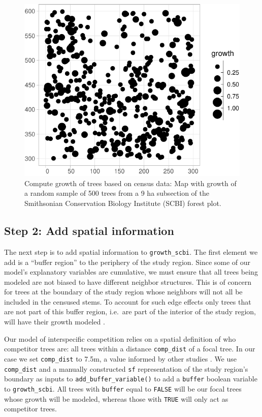 \documentclass[12pt]{article}
\begin{document}
\begin{figure}

{\centering \includegraphics[width=0.66\linewidth]{Figures/scbi-trees-1} 

}

\caption{Compute growth of trees based on census data: Map with growth of a random sample of 500 trees from a 9 ha subsection of the Smithsonian Conservation Biology Institute (SCBI) forest plot.}\label{fig:scbi-trees}
\end{figure}

\hypertarget{spatial-information}{%
\subsection{Step 2: Add spatial information}\label{spatial-information}}

The next step is to add spatial information to \texttt{growth\_scbi}.
The first element we add is a ``buffer region'' to the periphery of the
study region. Since some of our model's explanatory variables are
cumulative, we must ensure that all trees being modeled are not biased
to have different neighbor structures. This is of concern for trees at
the boundary of the study region whose neighbors will not all be
included in the censused stems. To account for such edge effects only
trees that are not part of this buffer region, i.e.~are part of the
interior of the study region, will have their growth modeled
\citep{waller_applied_2004}.

Our model of interspecific competition relies on a spatial definition of
who competitor trees are: all trees within a distance
\texttt{comp\_dist} of a focal tree. In our case we set
\texttt{comp\_dist} to 7.5m, a value informed by other studies
\citep[\citet{uriarte_spatially_2004},
\citet{canham_neighborhood_2006}]{canham_neighborhood_2004}. We use
\texttt{comp\_dist} and a manually constructed \texttt{sf}
representation of the study region's boundary as inputs to
\texttt{add\_buffer\_variable()} to add a \texttt{buffer} boolean
variable to \texttt{growth\_scbi}. All trees with \texttt{buffer} equal
to \texttt{FALSE} will be our focal trees whose growth will be modeled,
whereas those with \texttt{TRUE} will only act as competitor trees.
\end{document}
